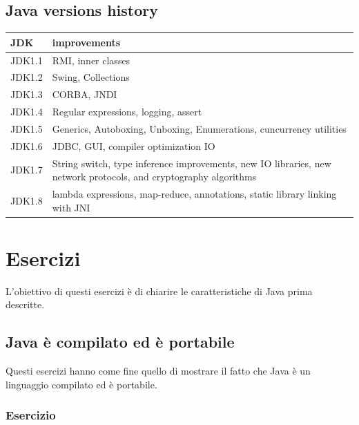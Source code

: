 \documentclass{article}
\theoremstyle{definition}
\begin{document}
\subsection{Java versions history}
\begin{table}[h]
\center
\begin{tabular}{ | p{1cm} | p{12cm} |}
\hline
JDK & improvements \\
\hline
JDK1.1 & RMI, inner classes \\
JDK1.2 & Swing, Collections \\
JDK1.3 & CORBA, JNDI \\
JDK1.4 & Regular expressions, logging, assert  \\
JDK1.5 & Generics, Autoboxing, Unboxing, Enumerations, cuncurrency utilities  \\
JDK1.6 & JDBC, GUI, compiler optimization IO \\
JDK1.7 & String switch, type inference improvements, new IO libraries, new network protocols, and cryptography algorithms  \\
JDK1.8 & lambda expressions,  map-reduce, annotations, static library linking with JNI\\
\hline
\end{tabular}

\end{table}

\section{Esercizi}
L'obiettivo di questi esercizi \`e di chiarire le caratteristiche di Java prima descritte.

\subsection{Java \`e compilato ed \`e portabile}
Questi esercizi hanno come fine quello di mostrare il fatto che Java \`e un linguaggio compilato ed \`e portabile. 

\subsubsection{Esercizio}
\end{document}
